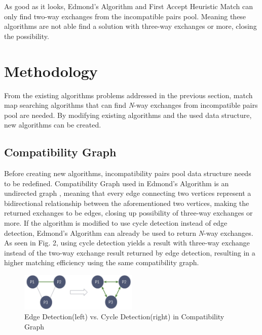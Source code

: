 \documentclass[conference]{IEEEtran}
\begin{document}
As good as it looks, Edmond's Algorithm and First Accept Heuristic Match can only find two-way exchanges from the
incompatible pairs pool. Meaning these algorithms are not able find a solution with three-way exchanges or more,
closing the possibility.

\section{Methodology}
From the existing algorithms problems addressed in the previous section, match map searching algorithms that can find
\textit{N}-way exchanges from incompatible pairs pool are needed. By modifying existing algorithms and the used data
structure, new algorithms can be created.

\subsection{Compatibility Graph}
Before creating new algorithms, incompatibility pairs pool data structure needs to be redefined. Compatibility Graph
used in Edmond's Algorithm is an undirected graph \cite{raja}, meaning that every edge connecting two vertices represent a bidirectional
relationship between the aforementioned two vertices, making the returned exchanges to be edges, closing up possibility
of three-way exchanges or more. If the algorithm is modified to use cycle detection instead of edge detection, Edmond's
Algorithm can already be used to return \textit{N}-way exchanges.
As seen in Fig. 2, using cycle detection yields a result with three-way exchange instead of the two-way exchange result
returned by edge detection, resulting in a higher matching efficiency using the same compatibility graph. 

\begin{figure}
    \includegraphics[width=0.5\textwidth]{images/edge-vs-cycle-detection.jpg}
    \caption{Edge Detection(left) vs. Cycle Detection(right) in Compatibility Graph}
\end{figure}
\end{document}
